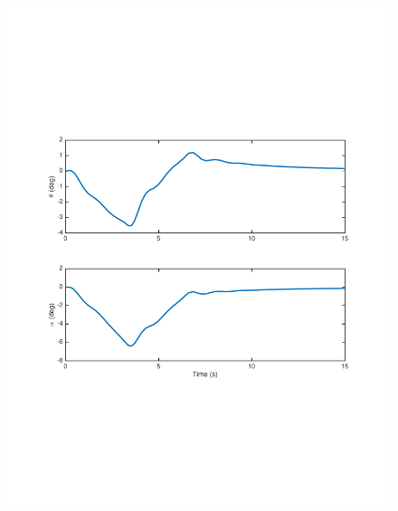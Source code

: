 \documentclass[12pt]{article}
\begin{document}
\begin{figure}[h]
\begin{center}
\includegraphics[width=1\textwidth]{figures/output angles}
\end{center}
\end{figure}
\end{document}
